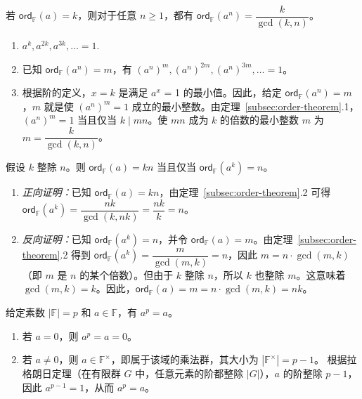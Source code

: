 \begin{tcolorbox}[title={\textbf{\tboxtheorem{\ref*{subsec:order-theorem}.2} 阶的性质（II）}}]
若 $\textsf{ord}_{\mathbb{F}}(a) = k$，则对于任意 $n \geq 1$，都有 $\textsf{ord}_{\mathbb{F}}(a^n) = \dfrac{k} {\gcd(k, n)}$。
\end{tcolorbox}
\begin{myproof}
    \begin{enumerate}
    \item $a^k, a^{2k}, a^{3k}, \ldots = 1$. 
    \item 已知 $\textsf{ord}_{\mathbb{F}}(a^n) = m$，有 $(a^n)^m, (a^n)^{2m}, (a^n)^{3m}, \ldots = 1$。
    \item 根据阶的定义，$x=k$ 是满足 $a^x$ = 1 的最小值。因此，给定 $\textsf{ord}_{\mathbb{F}}(a^n) = m$，$m$ 就是使 $(a^n)^m = 1$ 成立的最小整数。由定理~\ref*{subsec:order-theorem}.1，$(a^n)^m=1$ 当且仅当 $k\mid mn$。使 $mn$ 成为 $k$ 的倍数的最小整数 $m$ 为 $m = \dfrac{k}{\gcd(k, n)}$。
    \end{enumerate}
\end{myproof}

\begin{tcolorbox}[title={\textbf{\tboxtheorem{\ref*{subsec:order-theorem}.3} 阶的性质（III）}}]
假设 $k$ 整除 $n$。则 $\textsf{ord}_{\mathbb{F}}(a) = kn$ 当且仅当 $\textsf{ord}_{\mathbb{F}}(a^k) = n$。
\end{tcolorbox}
\begin{myproof}
\begin{enumerate}
    \item \textit{正向证明：}已知 $\textsf{ord}_{\mathbb{F}}(a) = kn$，由定理~\ref*{subsec:order-theorem}.2 可得 $\textsf{ord}_{\mathbb{F}}(a^k) = \dfrac{nk}{\gcd(k, nk)} = \dfrac{nk}{k} = n$。
    \item \textit{反向证明：}已知 $\textsf{ord}_{\mathbb{F}}(a^k)=n$，并令 $\textsf{ord}_{\mathbb{F}}(a)=m$。由定理~\ref*{subsec:order-theorem}.2 得到 $\textsf{ord}_{\mathbb{F}}(a^k)=\dfrac{m}{\gcd(m,k)}=n$，因此 $m=n\cdot\gcd(m,k)$（即 $m$ 是 $n$ 的某个倍数）。但由于 $k$ 整除 $n$，所以 $k$ 也整除 $m$。这意味着 $\gcd(m,k) = k$。因此，$\textsf{ord}_{\mathbb{F}}(a)=m=n\cdot\gcd(m,k)=nk$。
\end{enumerate}
\end{myproof}

\begin{tcolorbox}[title={\textbf{\tboxtheorem{\ref*{subsec:order-theorem}.4} 费马小定理}}]
给定素数 $|\mathbb{F}| = p$ 和 $a \in \mathbb{F}$，有 $a^p = a$。
\end{tcolorbox}
\begin{myproof}
    \begin{enumerate}
    \item 若 $a=0$，则 $a^p=a=0$。
    \item 若 $a\ne 0$，则 $a \in \mathbb{F}^{\times}$，即属于该域的乘法群，其大小为 $|\mathbb{F}^{\times}|=p-1$。
    根据拉格朗日定理（在有限群 $G$ 中，任意元素的阶都整除 $|G|$），$a$ 的阶整除 $p-1$，因此 $a^{p-1}=1$，从而 $a^p=a$。
    \end{enumerate}
\end{myproof}